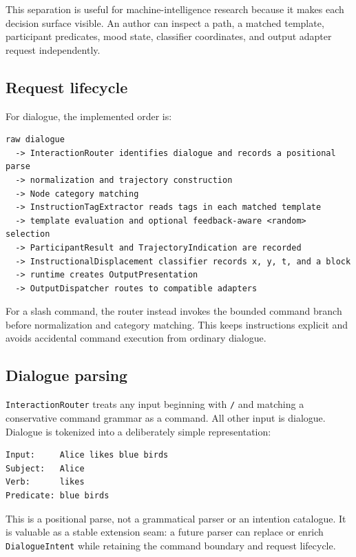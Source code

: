 \documentclass[11pt,a4paper]{article}
\begin{document}
This separation is useful for machine-intelligence research because it makes each decision surface visible. An author can inspect a path, a matched template, participant predicates, mood state, classifier coordinates, and output adapter request independently.

\subsection{Request lifecycle}

For dialogue, the implemented order is:

\begin{minipage}{\linewidth}
\begin{lstlisting}
raw dialogue
  -> InteractionRouter identifies dialogue and records a positional parse
  -> normalization and trajectory construction
  -> Node category matching
  -> InstructionTagExtractor reads tags in each matched template
  -> template evaluation and optional feedback-aware <random> selection
  -> ParticipantResult and TrajectoryIndication are recorded
  -> InstructionalDisplacement classifier records x, y, t, and a block
  -> runtime creates OutputPresentation
  -> OutputDispatcher routes to compatible adapters
\end{lstlisting}
\end{minipage}

For a slash command, the router instead invokes the bounded command branch before normalization and category matching. This keeps instructions explicit and avoids accidental command execution from ordinary dialogue.

\subsection{Dialogue parsing}

\texttt{InteractionRouter} treats any input beginning with \texttt{/} and matching a conservative command grammar as a command. All other input is dialogue. Dialogue is tokenized into a deliberately simple representation:

\begin{minipage}{\linewidth}
\begin{lstlisting}
Input:     Alice likes blue birds
Subject:   Alice
Verb:      likes
Predicate: blue birds
\end{lstlisting}
\end{minipage}

This is a positional parse, not a grammatical parser or an intention catalogue. It is valuable as a stable extension seam: a future parser can replace or enrich \texttt{DialogueIntent} while retaining the command boundary and request lifecycle.
\end{document}
